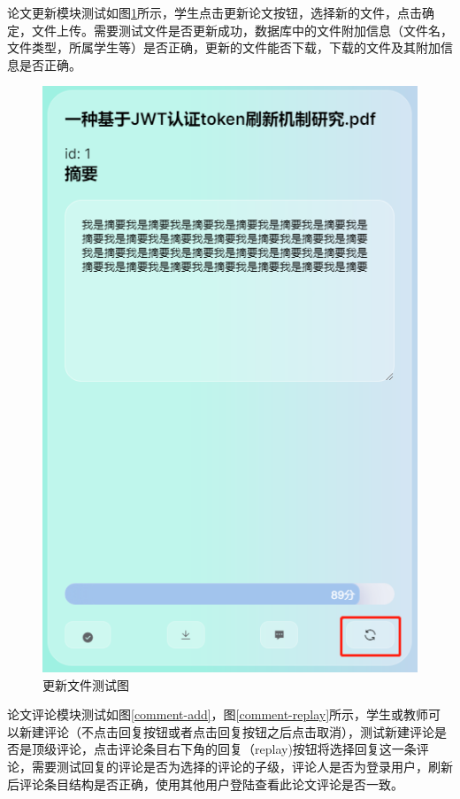 论文更新模块测试如图\ref{file-refresh-test}所示，学生点击更新论文按钮，选择新的文件，点击确定，文件上传。需要测试文件是否更新成功，数据库中的文件附加信息（文件名，文件类型，所属学生等）是否正确，更新的文件能否下载，下载的文件及其附加信息是否正确。

\begin{figure}[htbp]
  \centering
  \includegraphics[scale = 0.6]{out/figure/测试/file-refresh-test.png}
  \caption{\song\wuhao 更新文件测试图}
  \label{file-refresh-test}
\end{figure}

论文评论模块测试如图\ref{comment-add}，图\ref{comment-replay}所示，学生或教师可以新建评论（不点击回复按钮或者点击回复按钮之后点击取消），测试新建评论是否是顶级评论，点击评论条目右下角的回复（replay)按钮将选择回复这一条评论，需要测试回复的评论是否为选择的评论的子级，评论人是否为登录用户，刷新后评论条目结构是否正确，使用其他用户登陆查看此论文评论是否一致。

